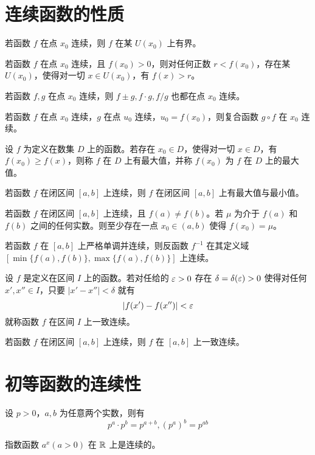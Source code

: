 \section{连续函数的性质}

\begin{theorem}[局部有界性]
    若函数 $f$ 在点 $x_0$ 连续，则 $f$ 在某 $U(x_0)$ 上有界。
\end{theorem}

\begin{theorem}[局部保号性]
    若函数 $f$ 在点 $x_0$ 连续，且 $f(x_0)>0$，则对任何正数 $r<f(x_0)$，存在某 $U(x_0)$，使得对一切 $x\in U(x_0)$，有 $f(x)>r$。
\end{theorem}

\begin{theorem}[四则运算]
    若函数 $f,g$ 在点 $x_0$ 连续，则 $f\pm g,f\cdot g,f/g$ 也都在点 $x_0$ 连续。
\end{theorem}

\begin{theorem}
    若函数 $f$ 在点 $x_0$ 连续，$g$ 在点 $u_0$ 连续，$u_0=f(x_0)$，则复合函数 $g\circ f$ 在 $x_0$ 连续。
\end{theorem}

\begin{definition}
    设 $f$ 为定义在数集 $D$ 上的函数。若存在 $x_0\in D$，使得对一切 $x\in D$，有 $f(x_0)\ge f(x)$，则称 $f$ 在 $D$ 上有最大值，并称 $f(x_0)$ 为 $f$ 在 $D$ 上的最大值。
\end{definition}

\begin{theorem}[最大、最小值定理]
    若函数 $f$ 在闭区间 $[a,b]$ 上连续，则 $f$ 在闭区间 $[a,b]$ 上有最大值与最小值。
\end{theorem}

\begin{theorem}[介值定理]
    若函数 $f$ 在闭区间 $[a,b]$ 上连续，且 $f(a)\ne f(b)$。若 $\mu$ 为介于 $f(a)$ 和 $f(b)$ 之间的任何实数。则至少存在一点 $x_0\in (a,b)$ 使得 $f(x_0)=\mu$。
\end{theorem}

\begin{theorem}
    若函数 $f$ 在 $[a,b]$ 上严格单调并连续，则反函数 $f^{-1}$ 在其定义域 $[\min\{f(a),f(b)\},\max\{f(a),f(b)\}]$ 上连续。
\end{theorem}

\begin{definition}
    设 $f$ 是定义在区间 $I$ 上的函数。若对任给的 $\varepsilon>0$ 存在 $\delta=\delta(\varepsilon)>0$ 使得对任何 $x',x''\in I$，只要 $|x'-x''|<\delta$ 就有
    $$|f(x')-f(x'')|<\varepsilon$$
    就称函数 $f$ 在区间 $I$ 上一致连续。
\end{definition}

\begin{theorem}[一致连续性]
    若函数 $f$ 在闭区间 $[a,b]$ 上连续，则 $f$ 在 $[a,b]$ 上一致连续。
\end{theorem}

\section{初等函数的连续性}

\begin{theorem}
    设 $p>0$，$a,b$ 为任意两个实数，则有
    $$p^a\cdot p^b = p^{a+b},(p^a)^b=p^{ab}$$
\end{theorem}

\begin{theorem}
    指数函数 $a^x(a>0)$ 在 $\mathbb{R}$ 上是连续的。
\end{theorem}
